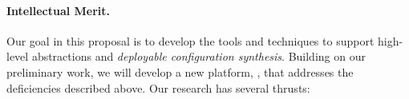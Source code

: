 
\paragraph*{Intellectual Merit.}
Our goal in this proposal is to develop the tools and techniques
to support high-level abstractions and {\em deployable configuration synthesis}.  Building on our preliminary work, we will develop a new platform, \Name, that addresses the deficiencies described above.  Our research has several thrusts:

